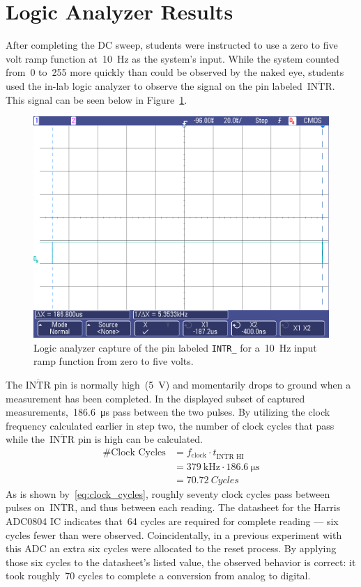 \section{Logic Analyzer Results}
After completing the DC sweep, students were instructed to use a zero to five
volt ramp function at~\SI{10}{\hertz} as the system's input.  While the system
counted from~0 to~255 more quickly than could be observed by the naked eye,
students used the in-lab logic analyzer to observe the signal on the pin
labeled~$\overline{\text{INTR}}$.  This signal can be seen below in
Figure~\ref{f:intr}.
%
\begin{figure}[H]
\centering
	\includegraphics[width=.8\textwidth]{img/shot/intr_high_period.png}
	\parbox{.8\textwidth}{
	\caption[\texttt{INTR\_} Waveform]{Logic analyzer capture of the pin
	labeled \texttt{INTR\_} for a~\SI{10}{\hertz} input ramp function from zero
	to five volts.}
	\label{f:intr}}
\end{figure}
%
The $\overline{\text{INTR}}$ pin is normally high~(\SI{5}{\volt}) and
momentarily drops to ground when a measurement has been completed.  In the
displayed subset of captured measurements,~\SI{186.6}{\micro\second} pass
between the two pulses.  By utilizing the clock frequency calculated earlier in
step two, the number of clock cycles that pass while
the~$\overline{\text{INTR}}$ pin is high can be calculated.
%
\begin{align}
	\text{\# Clock Cycles} &= f_\text{clock} \cdot t_{\overline{\text{INTR}}\text{ HI}}\label{eq:clock_cycles}\\
	&= \SI{379}{\kilo\hertz} \cdot \SI{186.6}{\micro\second}\nonumber \\
	&= \SI{70.72}{Cycles} \nonumber
\end{align}
%
As is shown by~\eqref{eq:clock_cycles}, roughly seventy clock cycles pass
between pulses on~$\overline{\text{INTR}}$, and thus between each reading.  The
datasheet for the Harris ADC0804 IC indicates that~64 cycles are required for
complete reading --- six cycles fewer than were observed.  Coincidentally, in a
previous experiment with this ADC an extra six cycles were allocated to the
reset process.  By applying those six cycles to the datasheet's listed value,
the observed behavior is correct: it took roughly~70 cycles to complete a
conversion from analog to digital.
